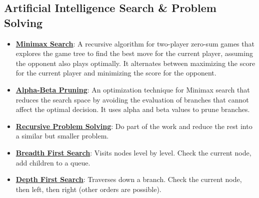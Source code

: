 \documentclass{article}%
\begin{document}
%
\subsection{Artificial Intelligence Search \& Problem Solving}%
\label{subsec:ArtificialIntelligenceSearchProblemSolving}%
\begin{itemize}[leftmargin=*]%
\item \href{https://purdue.brightspace.com/d2l/common/assets/pdfjs-d2l-dist/1.0.14-legacy/web/viewer.html?file=\%2Fcontent\%2Fenforced\%2F1095467-wl.202510.CS.24300.001\%2F02L2-Intro.pdf\%3Fou\%3D1095467\&lang=en-us\&container=d2l-fileviewer-rendered-pdf\&fullscreen=d2l-fileviewer-rendered-pdf-dialog\&height=667#page=22}{\textbf{Minimax Search}}: A recursive algorithm for two-player zero-sum games that explores the game tree to find the best move for the current player, assuming the opponent also plays optimally. It alternates between maximizing the score for the current player and minimizing the score for the opponent.%
\item \href{https://purdue.brightspace.com/d2l/common/assets/pdfjs-d2l-dist/1.0.14-legacy/web/viewer.html?file=\%2Fcontent\%2Fenforced\%2F1095467-wl.202510.CS.24300.001\%2F02L2-Intro.pdf\%3Fou\%3D1095467\&lang=en-us\&container=d2l-fileviewer-rendered-pdf\&fullscreen=d2l-fileviewer-rendered-pdf-dialog\&height=667#page=23}{\textbf{Alpha-Beta Pruning}}: An optimization technique for Minimax search that reduces the search space by avoiding the evaluation of branches that cannot affect the optimal decision. It uses alpha and beta values to prune branches.%
\item \href{https://purdue.brightspace.com/d2l/common/assets/pdfjs-d2l-dist/1.0.14-legacy/web/viewer.html?file=\%2Fcontent\%2Fenforced\%2F1095467-wl.202510.CS.24300.001\%2F14L1-DepthFS.pdf\%3Fou\%3D1095467\&lang=en-us\&container=d2l-fileviewer-rendered-pdf\&fullscreen=d2l-fileviewer-rendered-pdf-dialog\&height=667#page=4}{\textbf{Recursive Problem Solving}}: Do part of the work and reduce the rest into a similar but smaller problem.%
\item \href{https://purdue.brightspace.com/d2l/common/assets/pdfjs-d2l-dist/1.0.14-legacy/web/viewer.html?file=\%2Fcontent\%2Fenforced\%2F1095467-wl.202510.CS.24300.001\%2F14L1-DepthFS.pdf\%3Fou\%3D1095467\&lang=en-us\&container=d2l-fileviewer-rendered-pdf\&fullscreen=d2l-fileviewer-rendered-pdf-dialog\&height=667#page=8}{\textbf{Breadth First Search}}: Visits nodes level by level. Check the current node, add children to a queue.%
\item \href{https://purdue.brightspace.com/d2l/common/assets/pdfjs-d2l-dist/1.0.14-legacy/web/viewer.html?file=\%2Fcontent\%2Fenforced\%2F1095467-wl.202510.CS.24300.001\%2F14L1-DepthFS.pdf\%3Fou\%3D1095467\&lang=en-us\&container=d2l-fileviewer-rendered-pdf\&fullscreen=d2l-fileviewer-rendered-pdf-dialog\&height=667#page=8}{\textbf{Depth First Search}}: Traverses down a branch. Check the current node, then left, then right (other orders are possible).%

\end{itemize}
\end{document}

